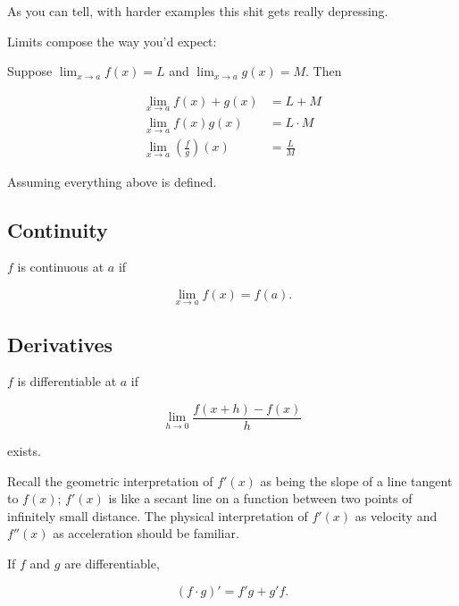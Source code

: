 \documentclass{article}
\begin{document}
As you can tell, with harder examples this shit gets really depressing.

Limits compose the way you'd expect:
\begin{theorem}
Suppose $\lim_{x \to a} f(x) = L$ and $\lim_{x \to a} g(x) = M$. Then

\begin{align}
\lim_{x \to a} f(x) + g(x) & = L + M \\
\lim_{x \to a} f(x)g(x) & = L \cdot M \\
\lim_{x \to a} \left(\frac{f}{g}\right)(x) & = \frac{L}{M}
\end{align}

Assuming everything above is defined.

\end{theorem}

\subsection{Continuity}

\begin{definition}

$f$ is continuous at $a$ if

\begin{equation}
\lim_{x \to a} f(x) = f(a).
\end{equation}

\end{definition}

\subsection{Derivatives}

\begin{definition} 
$f$ is differentiable at $a$ if

\begin{equation}
\lim_{h \to 0} \frac{f(x+h) - f(x)}{h}
\end{equation}

exists.
\end{definition}

Recall the geometric interpretation of $f'(x)$ as being the slope of a line
tangent to $f(x)$; $f'(x)$ is like a secant line on a function between two
points of infinitely small distance. The physical interpretation of $f'(x)$ as
velocity and $f''(x)$ as acceleration should be familiar.

\begin{theorem} 

If $f$ and $g$ are differentiable, 

\begin{equation}
(f \cdot g)' = f'g + g'f.
\end{equation}


\end{theorem} 
\end{document}
